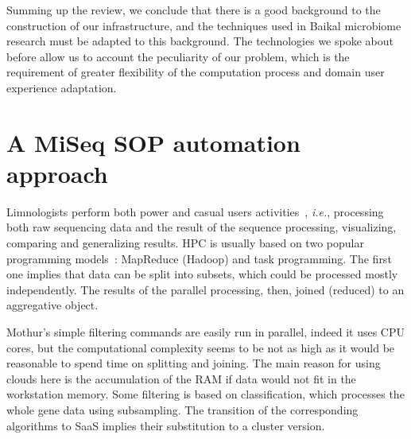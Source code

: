 \documentclass[a4paper]{jpconf}
\begin{document}
Summing up the review, we conclude that there is a good background to the construction of our infrastructure, and the techniques used in Baikal microbiome research must be adapted to this background. The technologies we spoke about before allow us to account the peculiarity of our problem, which is the requirement of greater flexibility of the computation process and domain user experience adaptation.







\section{A MiSeq SOP automation approach}
\label{sec:proc-mod}

Limnologists perform both power and casual users activities~\cite{guo16}, \emph{i.e.}, processing both raw sequencing data and the result of the sequence processing, visualizing, comparing and generalizing results. HPC is usually based on two popular programming models~\cite{guo16}: MapReduce (Hadoop) and task programming. The first one implies that data can be split into subsets, which could be processed mostly independently. The results of the parallel processing, then, joined (reduced) to an aggregative object.

 Mothur's simple filtering commands are easily run in parallel, indeed it uses CPU cores, but the computational complexity seems to be not as high as it would be reasonable to spend time on splitting and joining.  The main reason for using clouds here is the accumulation of the RAM if data would not fit in the workstation memory. %
Some filtering is based on classification, which processes the whole gene data using subsampling.  The transition of the corresponding algorithms to SaaS implies their substitution to a cluster version.
\end{document}
